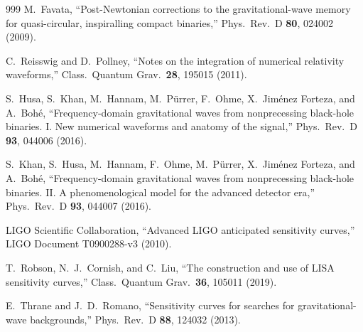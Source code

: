 \documentclass[twocolumn,floatfix,aps,prd,superscriptaddress,nofootinbib]{revtex4-2}
\begin{document}
\begin{thebibliography}{999}
M.~Favata,
\newblock ``Post-Newtonian corrections to the gravitational-wave memory for quasi-circular, inspiralling compact binaries,''
\newblock Phys.\ Rev.\ D \textbf{80}, 024002 (2009).

C.~Reisswig and D.~Pollney,
\newblock ``Notes on the integration of numerical relativity waveforms,''
\newblock Class.\ Quantum Grav.\ \textbf{28}, 195015 (2011).

S.~Husa, S.~Khan, M.~Hannam, M.~P\"urrer, F.~Ohme, X.~Jim\'enez Forteza, and A.~Boh\'e,
\newblock ``Frequency-domain gravitational waves from nonprecessing black-hole binaries. I. New numerical waveforms and anatomy of the signal,''
\newblock Phys.\ Rev.\ D \textbf{93}, 044006 (2016).

S.~Khan, S.~Husa, M.~Hannam, F.~Ohme, M.~P\"urrer, X.~Jim\'enez Forteza, and A.~Boh\'e,
\newblock ``Frequency-domain gravitational waves from nonprecessing black-hole binaries. II. A phenomenological model for the advanced detector era,''
\newblock Phys.\ Rev.\ D \textbf{93}, 044007 (2016).

LIGO Scientific Collaboration,
\newblock ``Advanced LIGO anticipated sensitivity curves,''
\newblock LIGO Document T0900288-v3 (2010).

T.~Robson, N.~J.~Cornish, and C.~Liu,
\newblock ``The construction and use of LISA sensitivity curves,''
\newblock Class.\ Quantum Grav.\ \textbf{36}, 105011 (2019).

E.~Thrane and J.~D.~Romano,
\newblock ``Sensitivity curves for searches for gravitational-wave backgrounds,''
\newblock Phys.\ Rev.\ D \textbf{88}, 124032 (2013).

\end{thebibliography}
\end{document}
